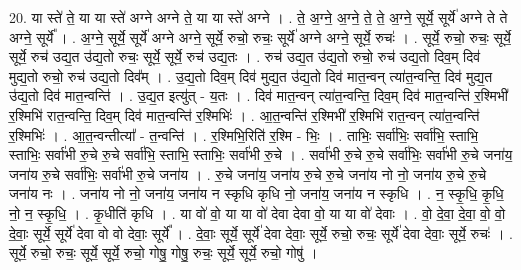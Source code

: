 \documentclass[17pt]{extarticle}
\begin{document}
20. या स्ते॑ ते॒ या या स्ते॑ अग्ने अग्ने ते॒ या या स्ते॑ अग्ने । . ते॒ अ॒ग्ने॒ अ॒ग्ने॒ ते॒ ते॒ अ॒ग्ने॒ सूर्ये॒ सूर्ये॑ अग्ने ते ते अग्ने॒ सूर्ये᳚ । . अ॒ग्ने॒ सूर्ये॒ सूर्ये॑ अग्ने अग्ने॒ सूर्ये॒ रुचो॒ रुचः॒ सूर्ये॑ अग्ने अग्ने॒ सूर्ये॒ रुचः॑ । . सूर्ये॒ रुचो॒ रुचः॒ सूर्ये॒ सूर्ये॒ रुच॑ उद्य॒त उ॑द्य॒तो रुचः॒ सूर्ये॒ सूर्ये॒ रुच॑ उद्य॒तः । . रुच॑ उद्य॒त उ॑द्य॒तो रुचो॒ रुच॑ उद्य॒तो दिव॒म् दिव॑ मुद्य॒तो रुचो॒ रुच॑ उद्य॒तो दिव᳚म् । . उ॒द्य॒तो दिव॒म् दिव॑ मुद्य॒त उ॑द्य॒तो दिव॑ मात॒न्वन् त्या॑त॒न्वन्ति॒ दिव॑ मुद्य॒त उ॑द्य॒तो दिव॑ मात॒न्वन्ति॑ । . उ॒द्य॒त इत्यु॑त् - य॒तः । . दिव॑ मात॒न्वन् त्या॑त॒न्वन्ति॒ दिव॒म् दिव॑ मात॒न्वन्ति॑ र॒श्मिभी॑ र॒श्मिभि॑ रात॒न्वन्ति॒ दिव॒म् दिव॑ मात॒न्वन्ति॑ र॒श्मिभिः॑ । . आ॒त॒न्वन्ति॑ र॒श्मिभी॑ र॒श्मिभि॑ रात॒न्वन् त्या॑त॒न्वन्ति॑ र॒श्मिभिः॑ । . आ॒त॒न्वन्तीत्या᳚ - त॒न्वन्ति॑ । . र॒श्मिभि॒रिति॑ र॒श्मि - भिः॒ । . ताभिः॒ सर्वा॑भिः॒ सर्वा॑भि॒ स्ताभि॒ स्ताभिः॒ सर्वा॑भी रु॒चे रु॒चे सर्वा॑भि॒ स्ताभि॒ स्ताभिः॒ सर्वा॑भी रु॒चे । . सर्वा॑भी रु॒चे रु॒चे सर्वा॑भिः॒ सर्वा॑भी रु॒चे जना॑य॒ जना॑य रु॒चे सर्वा॑भिः॒ सर्वा॑भी रु॒चे जना॑य । . रु॒चे जना॑य॒ जना॑य रु॒चे रु॒चे जना॑य नो नो॒ जना॑य रु॒चे रु॒चे जना॑य नः । . जना॑य नो नो॒ जना॑य॒ जना॑य न स्कृधि कृधि नो॒ जना॑य॒ जना॑य न स्कृधि । . न॒ स्कृ॒धि॒ कृ॒धि॒ नो॒ न॒ स्कृ॒धि॒ । . कृ॒धीति॑ कृधि । . या वो॑ वो॒ या या वो॑ देवा देवा वो॒ या या वो॑ देवाः । . वो॒ दे॒वा॒ दे॒वा॒ वो॒ वो॒ दे॒वाः॒ सूर्ये॒ सूर्ये॑ देवा वो वो देवाः॒ सूर्ये᳚ । . दे॒वाः॒ सूर्ये॒ सूर्ये॑ देवा देवाः॒ सूर्ये॒ रुचो॒ रुचः॒ सूर्ये॑ देवा देवाः॒ सूर्ये॒ रुचः॑ । . सूर्ये॒ रुचो॒ रुचः॒ सूर्ये॒ सूर्ये॒ रुचो॒ गोषु॒ गोषु॒ रुचः॒ सूर्ये॒ सूर्ये॒ रुचो॒ गोषु॑ । \newline
\end{document}
